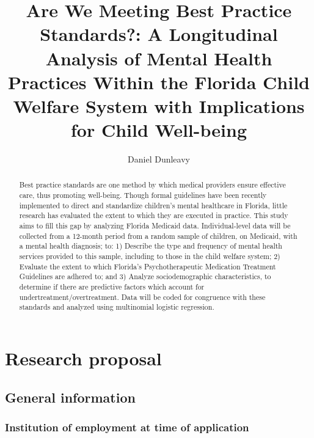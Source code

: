 \documentclass[twocolumn, serif, rga, authordate]{jote-article}
\title{Are We Meeting Best Practice Standards?: A Longitudinal Analysis of Mental Health Practices Within the Florida Child Welfare System with Implications for Child Well-being}
\author[1]{Daniel Dunleavy}
\affil[1]{Center for Translational Behavorial Science, 2010 Levy Ave Building B, Suite B0266, Tallahassee, FL 32310}
\begin{document}
    \begin{frontmatter}
    \maketitle
    \begin{abstract}
Best practice standards are one method by which medical providers ensure
effective care, thus promoting well-being. Though formal guidelines have
been recently implemented to direct and standardize children's mental
healthcare in Florida, little research has evaluated the extent to which
they are executed in practice. This study aims to fill this gap by
analyzing Florida Medicaid data. Individual-level data will be collected
from a 12-month period from a random sample of children, on Medicaid,
with a mental health diagnosis; to: 1) Describe the type and frequency
of mental health services provided to this sample, including to those in
the child welfare system; 2) Evaluate the extent to which Florida's
Psychotherapeutic Medication Treatment Guidelines are adhered to; and 3)
Analyze sociodemographic characteristics, to determine if there are
predictive factors which account for undertreatment/overtreatment. Data
will be coded for congruence with these standards and analyzed using
multinomial logistic regression.
    \end{abstract}
    \end{frontmatter}






\section*{Research proposal}



\subsection*{General information}



\subsubsection*{Institution of employment at time of application}
\end{document}
